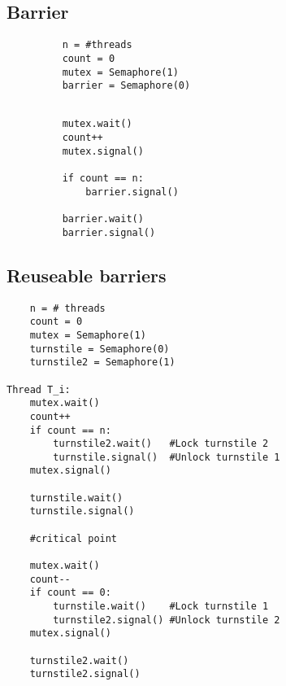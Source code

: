 \subsection{Barrier}
\begin{figure}[H]
\begin{verbatim}
    n = #threads
    count = 0
    mutex = Semaphore(1)
    barrier = Semaphore(0)
    
\end{verbatim}
\begin{verbatim}
    mutex.wait()
    count++
    mutex.signal()

    if count == n:
        barrier.signal()
    
    barrier.wait()
    barrier.signal()
\end{verbatim}
\end{figure}

\subsection{Reuseable barriers}
\begin{verbatim}
    n = # threads
    count = 0
    mutex = Semaphore(1)
    turnstile = Semaphore(0)
    turnstile2 = Semaphore(1)
    
Thread T_i:
    mutex.wait()
    count++
    if count == n:
        turnstile2.wait()   #Lock turnstile 2
        turnstile.signal()  #Unlock turnstile 1
    mutex.signal()
    
    turnstile.wait()
    turnstile.signal()
    
    #critical point
    
    mutex.wait()
    count--
    if count == 0:
        turnstile.wait()    #Lock turnstile 1
        turnstile2.signal() #Unlock turnstile 2
    mutex.signal()
    
    turnstile2.wait()
    turnstile2.signal()
\end{verbatim}

\newpage
